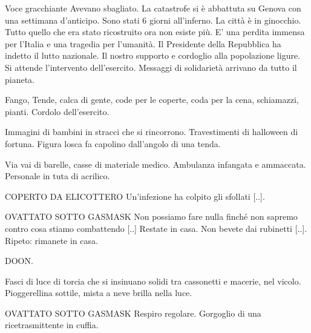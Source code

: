 \documentclass{screenplay}
\begin{document}
\begin{dialogue}{Voce gracchiante}
Avevano sbagliato. La catastrofe si \`{e} abbattuta su Genova con una settimana d'anticipo. Sono stati 6 giorni all'inferno. La 
citt\`{a} \`{e} in ginocchio. Tutto quello che era stato ricostruito ora non esiste pi\`{u}. E' una perdita immensa per l'Italia e una 
tragedia per l'umanit\`{a}. Il Presidente della Repubblica ha indetto il lutto nazionale. Il nostro supporto e cordoglio alla 
popolazione ligure. Si attende l'intervento dell'esercito. Messaggi di solidariet\`{a} arrivano da tutto il pianeta. 
\end{dialogue}


Fango, Tende, calca di gente, code per le coperte, coda per la cena, schiamazzi, pianti. Cordolo dell'esercito.



Immagini di bambini in stracci che si rincorrono. Travestimenti di halloween di fortuna. Figura losca fa capolino 
dall'angolo di una tenda.


Via vai di barelle, casse di materiale medico. Ambulanza infangata e ammaccata. Personale in tuta di acrilico.

\begin{dialogue}{COPERTO DA ELICOTTERO}
Un'infezione ha colpito gli sfollati [..]. 
\end{dialogue}

\begin{dialogue}{OVATTATO SOTTO GASMASK}
Non possiamo fare nulla finch\'{e} non sapremo contro cosa stiamo combattendo [..] Restate in casa. Non bevete dai rubinetti [..]. Ripeto: rimanete in casa.
\end{dialogue}

\begin{dialogue}{}
DOON.
\end{dialogue}



Fasci di luce di torcia che si insinuano solidi tra cassonetti e macerie, nel vicolo. Pioggerellina sottile, mista 
a neve brilla nella luce.

\begin{dialogue}{OVATTATO SOTTO GASMASK}
Respiro regolare. Gorgoglio di una ricetrasmittente in cuffia.
\end{dialogue}
\end{document}
